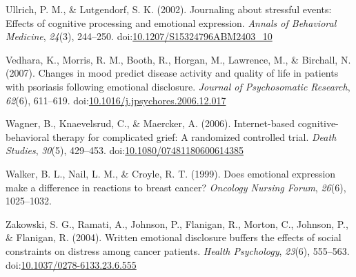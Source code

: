 \documentclass[man]{apa6}
\theoremstyle{definition}
\theoremstyle{definition}
\theoremstyle{definition}
\theoremstyle{remark}
\begin{document}
\leavevmode\hypertarget{ref-Ullrich2002a}{}%
Ullrich, P. M., \& Lutgendorf, S. K. (2002). Journaling about stressful
events: Effects of cognitive processing and emotional expression.
\emph{Annals of Behavioral Medicine}, \emph{24}(3), 244--250.
doi:\href{https://doi.org/10.1207/S15324796ABM2403_10}{10.1207/S15324796ABM2403\_10}

\leavevmode\hypertarget{ref-Vedhara2007}{}%
Vedhara, K., Morris, R. M., Booth, R., Horgan, M., Lawrence, M., \&
Birchall, N. (2007). Changes in mood predict disease activity and
quality of life in patients with psoriasis following emotional
disclosure. \emph{Journal of Psychosomatic Research}, \emph{62}(6),
611--619.
doi:\href{https://doi.org/10.1016/j.jpsychores.2006.12.017}{10.1016/j.jpsychores.2006.12.017}

\leavevmode\hypertarget{ref-Wagner2006}{}%
Wagner, B., Knaevelsrud, C., \& Maercker, A. (2006). Internet-based
cognitive-behavioral therapy for complicated grief: A randomized
controlled trial. \emph{Death Studies}, \emph{30}(5), 429--453.
doi:\href{https://doi.org/10.1080/07481180600614385}{10.1080/07481180600614385}

\leavevmode\hypertarget{ref-Walker1999a}{}%
Walker, B. L., Nail, L. M., \& Croyle, R. T. (1999). Does emotional
expression make a difference in reactions to breast cancer?
\emph{Oncology Nursing Forum}, \emph{26}(6), 1025--1032.

\leavevmode\hypertarget{ref-Zakowski2004}{}%
Zakowski, S. G., Ramati, A., Johnson, P., Flanigan, R., Morton, C.,
Johnson, P., \& Flanigan, R. (2004). Written emotional disclosure
buffers the effects of social constraints on distress among cancer
patients. \emph{Health Psychology}, \emph{23}(6), 555--563.
doi:\href{https://doi.org/10.1037/0278-6133.23.6.555}{10.1037/0278-6133.23.6.555}
\end{document}
